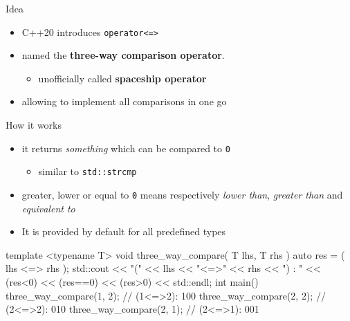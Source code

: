\begin{frame}[fragile]
  \begin{block}{Idea}
    \begin{itemize}
    \item C++20 introduces \texttt{operator<=>}
    \item named the \textbf{three-way comparison operator}.
      \begin{itemize}
      \item unofficially called \textbf{spaceship operator}
      \end{itemize}
    \item allowing to implement all comparisons in one go
    \end{itemize}
  \end{block}
  \begin{exampleblock}{How it works}
    \begin{itemize}
    \item it returns \emph{something} which can be compared to \texttt{0}
      \begin{itemize}
      \item similar to \texttt{std::strcmp}
      \end{itemize}
    \item greater, lower or equal to \texttt{0} means respectively \emph{lower than}, \emph{greater than} and \emph{equivalent to}
    \item It is provided by default for all predefined types
    \end{itemize}
  \end{exampleblock}
\end{frame}

\begin{frame}[fragile]
  \begin{exampleblock}{}
    \begin{cppcode*}{}
    template <typename T>
    void three_way_compare( T lhs, T rhs ) {
      auto res = ( lhs <=> rhs );
      std::cout << "(" << lhs << "<=>" << rhs << ") : "
                << (res<0) << (res==0) << (res>0)
                << std::endl;
    }
    int main() {
      three_way_compare(1, 2); // (1<=>2): 100
      three_way_compare(2, 2); // (2<=>2): 010
      three_way_compare(2, 1); // (2<=>1): 001
    }
    \end{cppcode*}
  \end{exampleblock}
\end{frame}

